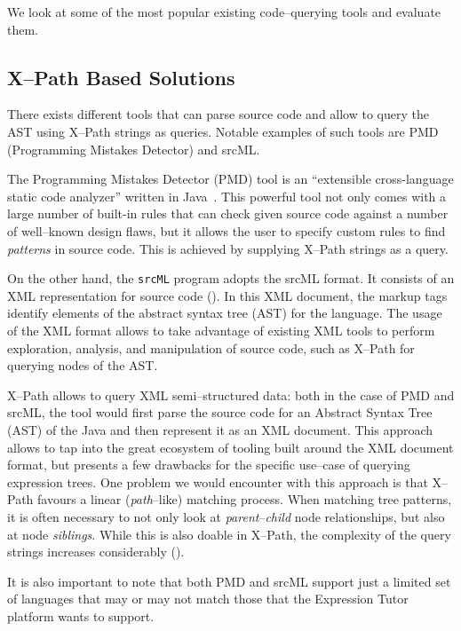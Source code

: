 \begin{chapterBody}
We look at some of the most popular existing code–querying tools and
evaluate them.

\subsection{X–Path Based Solutions}

There exists different tools that can parse source code and allow to query the
AST using X–Path strings as queries. Notable examples of such tools are PMD
(Programming Mistakes Detector) and srcML\@.

The Programming Mistakes Detector (PMD) tool is an ``extensible cross-language
static code analyzer'' written in Java~\cite{copeland_pmd_2002}.
This powerful tool not only comes with a large number of built-in rules that
can check given source code against a number of well–known design flaws, but
it allows the user to specify custom rules to find \textit{patterns} in source
code. This is achieved by supplying X–Path strings as a query.

On the other hand, the \texttt{srcML} program adopts the srcML format. It
consists of an XML representation for source code (\citet{collard_srcml_2016}).
In this XML document, the markup tags identify elements of the abstract syntax
tree (AST) for the language. The usage of the XML format allows to take
advantage of existing XML tools to perform exploration, analysis, and 
manipulation of source code, such as X–Path for querying nodes of the AST\@.

X–Path allows to query XML semi–structured data: both in the case of PMD and
srcML, the tool would first parse the source code for an Abstract Syntax Tree
(AST) of the Java and then represent it as an XML document.
This approach allows to tap into the great ecosystem of tooling built around
the XML document format, but presents a few drawbacks for the specific use–case
of querying expression trees.
One problem we would encounter with this approach is that X–Path favours a
linear (\textit{path}–like) matching process.
When matching tree patterns, it is often necessary to not only look at
\textit{parent}–\textit{child} node relationships, but also at node
\textit{siblings}.
While this is also doable in X–Path, the complexity of the query strings
increases considerably (\citet{goos_xpath_2002}).

It is also important to note that both PMD and srcML support just a limited
set of languages that may or may not match those that the Expression Tutor
platform wants to support.


\end{chapterBody}
